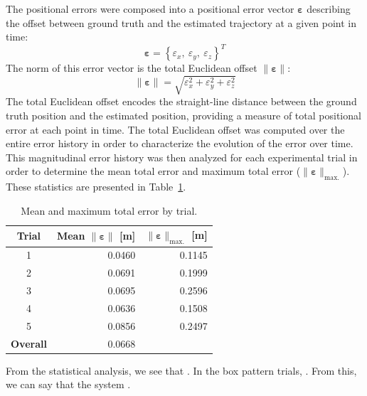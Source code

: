 The positional errors were composed into a positional error vector $\bm{\varepsilon}$ describing the offset between ground truth and the estimated trajectory at a given point in time:
%
\begin{equation}
\bm{\varepsilon} = \left\lbrace \varepsilon_{x},\ \varepsilon_{y},\ \varepsilon_{z} \right\rbrace ^{T}
\end{equation}
%
The norm of this error vector is the total Euclidean offset $\| \bm{\varepsilon} \|$:
%
\begin{equation}
\| \bm{\varepsilon} \| = \sqrt{\varepsilon_{x}^{2} + \varepsilon_{y}^{2} + \varepsilon_{z}^{2}} 
\end{equation}
%
The total Euclidean offset encodes the straight-line distance between the ground truth position and the estimated position, providing a measure of total positional error at each point in time. The total Euclidean offset was computed over the entire error history in order to characterize the evolution of the error over time. This magnitudinal error history was then analyzed for each experimental trial in order to determine the mean total error and maximum total error ($\| \bm{\varepsilon} \|_{\text{max.}}$). These statistics are presented in Table~\ref{tab:total_err}.

\begin{table}[h]\centering
\caption[Mean and Maximum Total Error]{Mean and maximum total error by trial.}
\begin{tabular}[c]{crr}
\toprule
Trial & Mean $\| \bm{\varepsilon} \|$ [m] & $\| \bm{\varepsilon} \|_{\text{max.}}$ [m] \\
\hline
1 & 0.0460 & 0.1145 \\
2 & 0.0691 & 0.1999 \\
3 & 0.0695 & 0.2596 \\
4 & 0.0636 & 0.1508 \\
5 & 0.0856 & 0.2497 \\
\hline
\textbf{Overall} & 0.0668 \\
\bottomrule
\end{tabular}
\label{tab:total_err}
\end{table}

From the statistical analysis, we see that . In the box pattern trials, . From this, we can say that the system .